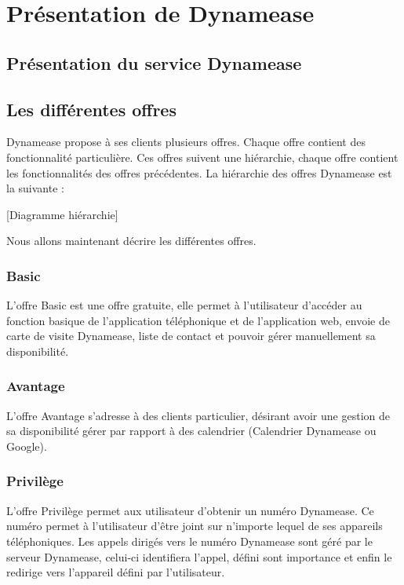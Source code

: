 \section{Présentation de Dynamease}

\subsection{Présentation du service Dynamease}

\subsection{Les différentes offres}

Dynamease propose à ses clients plusieurs offres. Chaque offre contient des fonctionnalité particulière. Ces offres suivent une hiérarchie, chaque offre contient les fonctionnalités des offres précédentes. La hiérarchie des offres Dynamease est la suivante :

[Diagramme hiérarchie]

Nous allons maintenant décrire les différentes offres.

\subsubsection{Basic}

L'offre Basic est une offre gratuite, elle permet à l'utilisateur d'accéder au fonction basique de l'application téléphonique et de l'application web, envoie de carte de visite Dynamease, liste de contact et pouvoir gérer manuellement sa disponibilité.

\subsubsection{Avantage}

L'offre Avantage s'adresse à des clients particulier, désirant avoir une gestion de sa disponibilité gérer par rapport à des calendrier (Calendrier Dynamease ou Google).

\subsubsection{Privilège}

L'offre Privilège permet aux utilisateur d'obtenir un numéro Dynamease. Ce numéro permet à l'utilisateur d'être joint sur n'importe lequel de ses appareils téléphoniques. Les appels dirigés vers le numéro Dynamease sont géré par le serveur Dynamease, celui-ci identifiera l'appel, défini sont importance et enfin le redirige vers l'appareil défini par l'utilisateur.

